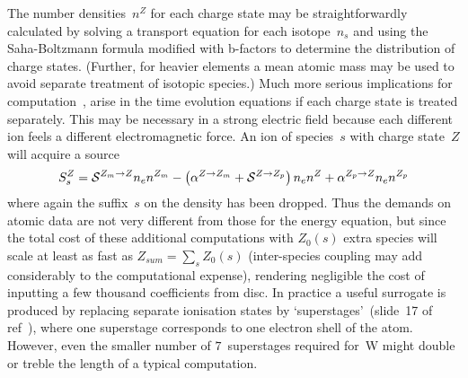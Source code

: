 The number densities~$n^Z$ for each charge state may be straightforwardly calculated by
solving a transport equation for each isotope~$n_s$ and using the Saha-Boltzmann formula modified
with b-factors to determine the distribution of charge states. (Further, for heavier elements
a mean atomic mass may be used to avoid separate treatment of isotopic species.)
Much more serious implications for computation~\cite{omullane},
arise in the time evolution equations if each charge state is treated separately.
This may be necessary in a strong electric field because each different ion feels
a different electromagnetic force.
An ion of species~$s$ with charge state~$Z$ will acquire a source
\begin{equation} \label{eq:nzsource}
S_s^Z=\mathcal{S}^{Z_m\rightarrow Z}n_e n^{Z_m} - \left(\alpha^{Z\rightarrow Z_m}+\mathcal{S}^{Z\rightarrow Z_p}\right) n_e n^Z+
\alpha^{Z_p\rightarrow Z} n_e n^{Z_p}
\end{equation}
where again the suffix~$s$ on the density has been dropped. Thus the demands on atomic data
are not very different from those for the energy equation, but 
since the total cost of these additional computations with $Z_0(s)$ extra species will
scale at least as fast as $Z_{sum}=\sum_s Z_0(s)$ (inter-species coupling may add considerably
to the computational expense), rendering negligible
the cost of inputting a few thousand coefficients from disc. In practice a useful
surrogate is produced by replacing separate ionisation states by `superstages'~(slide~17 of ref~\cite{Su06ADAS}),
where one superstage corresponds to one electron shell of the atom. However, even the smaller number of $7$~superstages
required for~W might double or treble the length of a typical computation.

